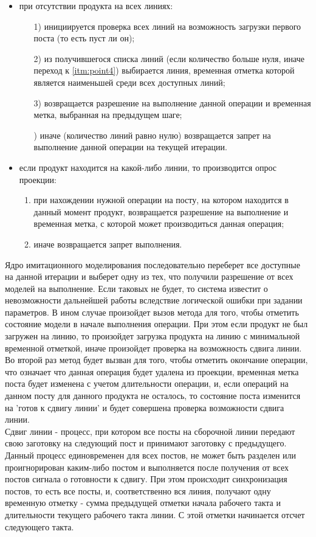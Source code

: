 \begin{itemize}
	\item при отсутствии продукта на всех линиях:
		\begin{enumerate}
			\item[1)] инициируется проверка всех линий на возможность загрузки первого поста (то есть пуст ли он);
			\item[2)] из получившегося списка линий (если количество больше нуля, иначе переход к \ref{itm:point4}) выбирается линия, временная отметка которой является наименьшей среди всех доступных линий;
			\item[3)] возвращается разрешение на выполнение данной операции и временная метка, выбранная на предыдущем шаге;
			\item[\mylabel{itm:point4}{4})] иначе (количество линий равно нулю) возвращается запрет на выполнение данной операции на текущей итерации.
		\end{enumerate}
	\item если продукт находится на какой-либо линии, то производится опрос проекции:
		\begin{enumerate}
			\item при нахождении нужной операции на посту, на котором находится в данный момент продукт, возвращается разрешение на выполнение и временная метка, с которой может производиться данная операция;
			\item иначе возвращается запрет выполнения.
		\end{enumerate}
\end{itemize}

\indent Ядро имитационного моделирования последовательно переберет все доступные на данной итерации и выберет одну из тех, что получили разрешение от всех моделей на выполнение.
Если таковых не будет, то система известит о невозможности дальнейшей работы вследствие логической ошибки при задании параметров.
В ином случае произойдет вызов метода для того, чтобы отметить состояние модели в начале выполнения операции.
При этом если продукт не был загружен на линию, то произойдет загрузка продукта на линию с минимальной временной отметкой, иначе произойдет проверка на возможность сдвига линии.\\
\indent Во второй раз метод будет вызван для того, чтобы отметить окончание операции, что означает что данная операция будет удалена из проекции, временная метка поста будет изменена с учетом длительности операции, и, если операций на данном посту для данного продукта не осталось, то состояние поста изменится на 'готов к сдвигу линии' и будет совершена проверка возможности сдвига линии.\\
\indent Сдвиг линии - процесс, при котором все посты на сборочной линии передают свою заготовку на следующий пост и принимают заготовку с предыдущего.
Данный процесс единовременен для всех постов, не может быть разделен или проигнорирован каким-либо постом и выполняется после получения от всех постов сигнала о готовности к сдвигу.
При этом происходит синхронизация постов, то есть все посты, и, соответственно вся линия, получают одну временную отметку - сумма предыдущей отметки начала рабочего такта и длительности текущего рабочего такта линии.
С этой отметки начинается отсчет следующего такта.

